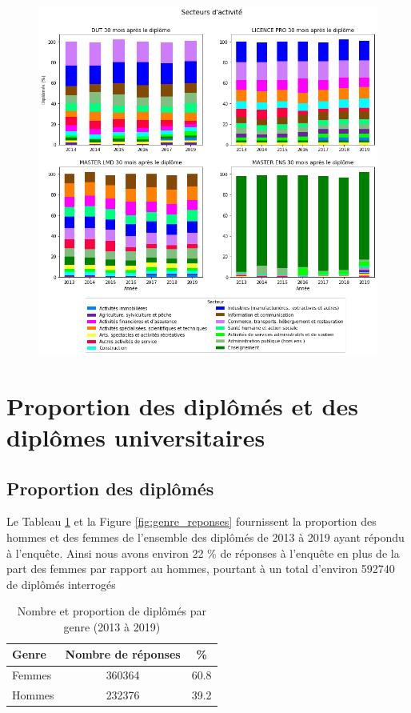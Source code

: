 \documentclass[12pt, a4paper, titlepage, table]{article}
\begin{document}
	\begin{figure}[H]
		\centering
		\includegraphics[width=1\textwidth]{../graphs/repartition_secteurs_situation.png}
	\end{figure}

\section{Proportion des diplômés et des diplômes universitaires}

	\subsection{Proportion des diplômés}
	Le Tableau \ref{tab:genre_responses} et la Figure \ref{fig:genre_reponses} fournissent la proportion des hommes et des femmes de l'ensemble des diplômés de 2013 à 2019 ayant répondu à l'enquête. Ainsi nous avons environ 22 \% de réponses à l'enquête en plus de la part des femmes par rapport au hommes, pourtant à un total d'environ 592740 de diplômés interrogés
	
		\begin{table}[H]
			\centering
			\begin{tabular}{lcc}
				\toprule
				\textbf{Genre} & \textbf{Nombre de réponses} & \textbf{\%} \\
				\midrule
				Femmes & 360364 & 60.8 \\
				Hommes & 232376 & 39.2 \\
				\bottomrule
			\end{tabular}
			\caption{Nombre et proportion de diplômés par genre (2013 à 2019)}
			\label{tab:genre_responses}
		\end{table}
	
\end{document}
